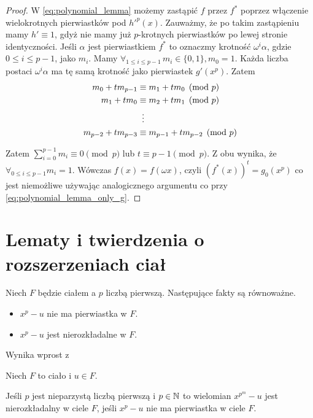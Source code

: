 \begin{proof}
  W \ref{eq:polynomial_lemma} możemy zastąpić $f$ przez $f^*$ poprzez włączenie
  wielokrotnych pierwiastków pod $h'^p(x)$. Zauważmy, że po takim zastąpieniu
  mamy $h' \equiv 1$, gdyż nie mamy już $p$-krotnych pierwiastków po lewej
  stronie identyczności. Jeśli $\alpha$ jest pierwiastkiem $f^*$ to oznaczmy
  krotność $\omega^i\alpha$, gdzie $0 \leq i \leq p - 1$, jako $m_i$. Mamy
  $\forall_{1 \leq i \leq p - 1} \, m_i \in \{0, 1\}, m_0 = 1$.  Każda liczba
  postaci $\omega^i\alpha$ ma tę samą krotność jako pierwiastek $g' \left( x^p
  \right)$. Zatem
  \begin{align*}
    m_0 + tm_{p-1} &\equiv m_1 + tm_0 \pmod{p}\\
    m_1 + tm_{0} &\equiv m_2 + tm_1 \pmod{p}\\
                 &\mathrel{\makebox[\widthof{=}]{\vdots}}\\
    m_{p-2} + tm_{p-3} &\equiv m_{p-1} + tm_{p-2} \pmod{p}\\
  \end{align*}

  Zatem $\sum_{i=0}^{p-1} m_i \equiv 0 \pmod{p}$ lub $t \equiv p-1 \pmod{p}$. Z
  obu wynika, że $\forall_{0 \leq i \leq p-1} m_i = 1$. Wówczas $f(x) = f(\omega
  x)$, czyli $\left( f^*(x) \right)^t = g_0 \left( x^p \right)$ co jest
  niemożliwe używając analogicznego argumentu co przy
  \ref{eq:polynomial_lemma_only_g}.


\end{proof}

\section{Lematy i twierdzenia o rozszerzeniach ciał}
\begin{theorem}
  Niech $F$ będzie ciałem a $p$ liczbą pierwszą. Następujące fakty są
  równoważne.

  \begin{itemize}
    \item $x^p - u$ nie ma pierwiastka w $F$.
    \item $x^p - u$ jest nierozkładalne w $F$.
  \end{itemize}
  \label{th:14_1_1}
\end{theorem}

  Wynika wprost z \cite[Twierdzenie 14.1.1]{rom06}

\begin{theorem}
  Niech $F$ to ciało i $u \in F$.

  Jeśli $p$ jest nieparzystą liczbą pierwszą i $p \in \mathbb{N}$ to wielomian
  $x^{p^m} - u$ jest nierozkładalny w ciele $F$, jeśli
  $x^p - u$ nie ma pierwiastka w ciele $F$.
  \label{th:14_1_2}
\end{theorem}

